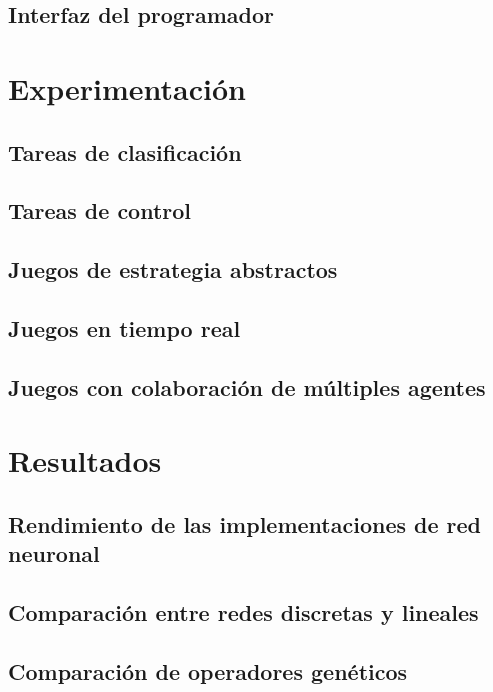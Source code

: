 \documentclass[a4paper,11pt]{article}
\begin{document}
	\subsection{ Interfaz del programador}\label{disenoInterfProgr}


\section{Experimentaci\'on}\label{experimentacion}
	\subsection{ Tareas de clasificaci\'on}
	\subsection{ Tareas de control}
	\subsection{ Juegos de estrategia abstractos}
	\subsection{ Juegos en tiempo real}
	\subsection{ Juegos con colaboraci\'on de m\'ultiples agentes}


\section{Resultados}\label{resul}
	\subsection{ Rendimiento de las implementaciones de red neuronal}
	\subsection{ Comparaci\'on entre redes discretas y lineales}
	\subsection{ Comparaci\'on de operadores gen\'eticos}
\end{document}
